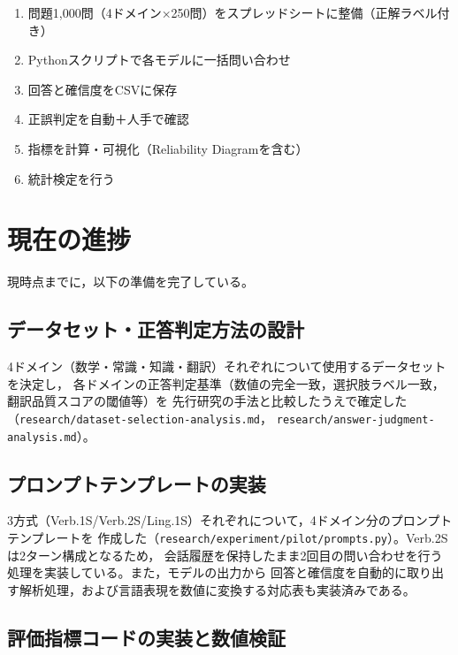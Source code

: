 \documentclass[11pt,a4paper,oneside]{article}
\begin{document}
\begin{enumerate}
  \item 問題1,000問（4ドメイン×250問）をスプレッドシートに整備（正解ラベル付き）
  \item Pythonスクリプトで各モデルに一括問い合わせ
  \item 回答と確信度をCSVに保存
  \item 正誤判定を自動＋人手で確認
  \item 指標を計算・可視化（Reliability Diagramを含む）
  \item 統計検定を行う
\end{enumerate}

\section{現在の進捗}

現時点までに，以下の準備を完了している。

\subsection{データセット・正答判定方法の設計}

4ドメイン（数学・常識・知識・翻訳）それぞれについて使用するデータセットを決定し，
各ドメインの正答判定基準（数値の完全一致，選択肢ラベル一致，翻訳品質スコアの閾値等）を
先行研究の手法と比較したうえで確定した（\texttt{research/dataset-selection-analysis.md}，
\texttt{research/answer-judgment-analysis.md}）。

\subsection{プロンプトテンプレートの実装}

3方式（Verb.1S/Verb.2S/Ling.1S）それぞれについて，4ドメイン分のプロンプトテンプレートを
作成した（\texttt{research/experiment/pilot/prompts.py}）。Verb.2Sは2ターン構成となるため，
会話履歴を保持したまま2回目の問い合わせを行う処理を実装している。また，モデルの出力から
回答と確信度を自動的に取り出す解析処理，および言語表現を数値に変換する対応表も実装済みである。

\subsection{評価指標コードの実装と数値検証}
\end{document}
